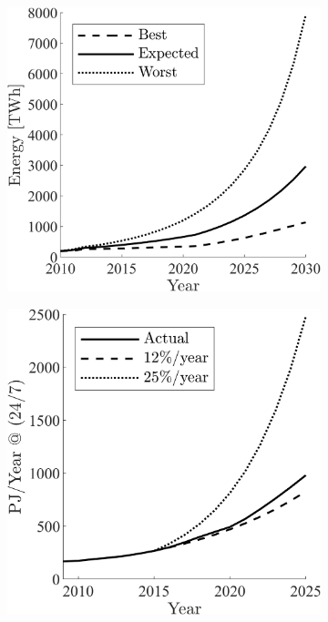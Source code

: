 \documentclass[12pt]{article}
\begin{document}
\begin{figure}[!t]
	\centering
	\hspace*{\fill}
	\begin{subfigure}[t]{0.32\textwidth}
		\subcaption{}
		\includegraphics[width= \textwidth]{data_center_energy_consumption.png} \label{fig:dataCenterEnergy}
	\end{subfigure}
	\hfill
	\begin{subfigure}[t]{0.32\textwidth}
		\subcaption{}
		\includegraphics[width=\textwidth]{ir_energy_projections.png} \label{fig:ir_energy}

\end{subfigure}
\end{figure}
\end{document}
